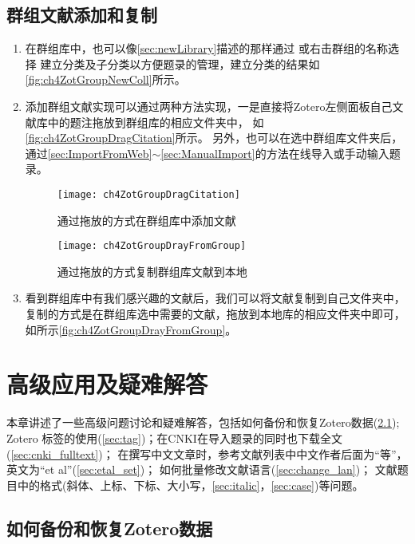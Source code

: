 \documentclass[cn,11pt,chinese]{elegantbook}
\begin{document}
\section{群组文献添加和复制}\label{sec:copyGroupLibrary}
\begin{enumerate}
	\item 在群组库中，也可以像\cref{sec:newLibrary}描述的那样通过
	或右击群组的名称选择
	建立分类及子分类以方便题录的管理，建立分类的结果如\autoref{fig:ch4ZotGroupNewColl}所示。
	\item 添加群组文献实现可以通过两种方法实现，一是直接将Zotero左侧面板自己文献库中的题注拖放到群组库的相应文件夹中，
	如\autoref{fig:ch4ZotGroupDragCitation}所示。
	另外，也可以在选中群组库文件夹后，通过\cref{sec:ImportFromWeb}$\sim$\cref{sec:ManualImport}的方法在线导入或手动输入题录。
		\begin{figure}[htbp]
			\centering
			\texttt{[image: ch4ZotGroupDragCitation]}
			\caption{通过拖放的方式在群组库中添加文献}
			\label{fig:ch4ZotGroupDragCitation}
		\end{figure}

			\begin{figure}[htbp]
			\centering
			\texttt{[image: ch4ZotGroupDrayFromGroup]}
			\caption{通过拖放的方式复制群组库文献到本地}
			\label{fig:ch4ZotGroupDrayFromGroup}
			\end{figure}
		\item 看到群组库中有我们感兴趣的文献后，我们可以将文献复制到自己文件夹中，
		复制的方式是在群组库选中需要的文献，拖放到本地库的相应文件夹中即可，
		如所示\autoref{fig:ch4ZotGroupDrayFromGroup}。
	\end{enumerate}

  \chapter{高级应用及疑难解答}\label{ch:questions}
	本章讲述了一些高级问题讨论和疑难解答，包括如何备份和恢复Zotero数据(\cref{sec:back});
	Zotero 标签的使用(\cref{sec:tag})；在CNKI在导入题录的同时也下载全文(\cref{sec:cnki_fulltext})；
	在撰写中文文章时，参考文献列表中中文作者后面为“等”，英文为“et al”(\cref{sec:etal_set})；
	如何批量修改文献语言(\cref{sec:change_lan})；
	文献题目中的格式(斜体、上标、下标、大小写，\cref{sec:italic}，\cref{sec:case})等问题。
		
	\section{如何备份和恢复Zotero数据} \label{sec:back}
 
\end{document}
